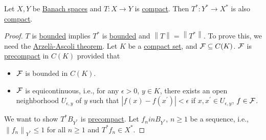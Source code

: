 \begin{theorem}
	Let \(X, Y\) be \hyperref[def:Banach-space]{Banach spaces} and \(T\colon X\to Y\) is \hyperref[def:compact-op]{compact}. Then \(T^{\ast} \colon Y^{\ast} \to X^{\ast} \) is also \hyperref[def:compact-op]{compact}.
\end{theorem}
\begin{proof}
	\(T\) is \hyperref[def:bounded-map]{bounded} implies \(T^{\ast} \) is \hyperref[def:bounded-map]{bounded} and \(\left\lVert T\right\rVert = \left\lVert T^{\ast} \right\rVert \). To prove this, we need the \href{https://en.wikipedia.org/wiki/Arzel%C3%A0%E2%80%93Ascoli_theorem}{Arzelà-Ascoli theorem}. Let \(K\) be a \hyperref[def:compact]{compact set}, and \(\mathcal{\MakeUppercase{f}} \subseteq C(K)\). \(\mathcal{\MakeUppercase{f}} \) is \hyperref[def:precompct]{precompact} in \(C(K)\) provided that 
	\begin{itemize}
		\item \(\mathcal{\MakeUppercase{f}} \) is bounded in \(C(K)\).
		\item \(\mathcal{\MakeUppercase{f}} \) is equicontinuous, i.e., for any \(\epsilon >0\), \(y\in K\), there exists an open neighborhood \(U_{\epsilon , y}\) of \(y\) such that \(\left\vert f(x) - f(x^\prime ) \right\vert< \epsilon \) if \(x, x^\prime \in U_{\epsilon , y}\), \(f\in \mathcal{\MakeUppercase{f}} \).
	\end{itemize}
	We want to show \(T^{\ast} B_{Y^{\ast} }\) is \hyperref[def:precompact]{precompact}. Let \(f_{n} in B_{Y^{\ast} }\), \(n \geq 1\) be a sequence, i.e., \(\left\lVert f_n \right\rVert _{Y^{\ast} } \leq 1\) for all \(n\geq 1\) and \(T^{\ast} f_{n} \in X^{\ast} \).
\end{proof}
